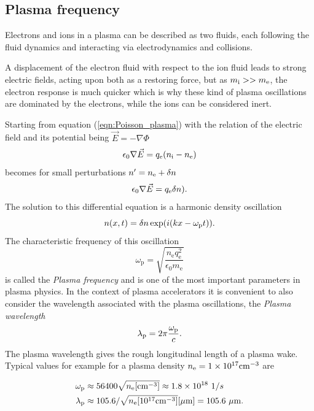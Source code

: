 \subsection*{Plasma frequency}

Electrons and ions in a plasma can be described as two fluids, each following the fluid dynamics and interacting via electrodynamics and collisions.

A displacement of the electron fluid with respect to the ion fluid leads to strong electric fields, acting upon both as a restoring force, but as $m_\mathrm{i}>>m_\mathrm{e}$, the electron response is much quicker which is why these kind of plasma oscillations are dominated by the electrons, while the ions can be considered inert.

Starting from equation (\ref{eqn:Poisson_plasma}) with the relation of the electric field and its potential being $\vec{E}=-\nabla \Phi$ 
\begin{equation}
\epsilon_0 \nabla \vec{E}=q_\mathrm{e} (n_\mathrm{i}-n_\mathrm{e})
\end{equation}
becomes for small perturbations $n'=n_\mathrm{e}+\delta n$
\begin{equation}
\epsilon_0 \nabla \vec{E}=q_\mathrm{e} \delta n).
\end{equation}
The solution to this differential equation is a harmonic density oscillation 
\begin{equation}
n(x,t)=\delta n \exp(i(kx-\omega_\mathrm{p} t)).
\end{equation}
The characteristic frequency of this oscillation 
\begin{equation}
\omega_\mathrm{p}=\sqrt{\frac{n_\mathrm{e}q_\mathrm{e}^2}{\epsilon_0 m_\mathrm{e}}}
\end{equation}
is called the \textit{Plasma frequency} and is one of the most important parameters in plasma physics. 
In the context of plasma accelerators it is convenient to also consider the wavelength associated with the plasma oscillations, 
the \textit{Plasma wavelength}
\begin{equation}
\lambda_\mathrm{p}=2\pi\frac{\omega_\mathrm{p}}{c}.
\label{eqn:Plasma_wavelength}
\end{equation}
The plasma wavelength gives the rough longitudinal length of a plasma wake.
Typical values for example for a plasma density $n_\mathrm{e}=1\times10^{17}\mathrm{cm}^{-3}$ are

\begin{align*}
\omega_\mathrm{p} &\approx 56400 \sqrt{n_\mathrm{e} [\mathrm{cm}^{-3}]} \approx 1.8\times10^{18}\ 1/s\\
\lambda_\mathrm{p} & \approx 105.6 /\sqrt{n_\mathrm{e} [10^{17} \mathrm{cm}^{-3} ]} [\mu\mathrm{m}] = 105.6\ \mu\mathrm{m}.
\end{align*} 

